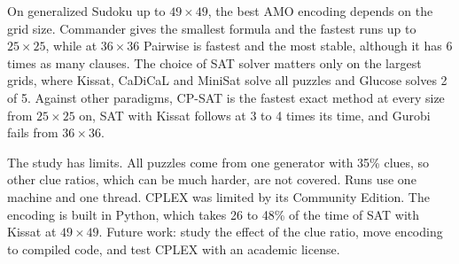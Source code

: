 On generalized Sudoku up to $49\times49$, the best AMO encoding depends on the grid size. Commander gives the smallest formula and the fastest runs up to $25\times25$, while at $36\times36$ Pairwise is fastest and the most stable, although it has 6 times as many clauses. The choice of SAT solver matters only on the largest grids, where Kissat, CaDiCaL and MiniSat solve all puzzles and Glucose solves 2 of 5. Against other paradigms, CP-SAT is the fastest exact method at every size from $25\times25$ on, SAT with Kissat follows at 3 to 4 times its time, and Gurobi fails from $36\times36$.

The study has limits. All puzzles come from one generator with 35\% clues, so other clue ratios, which can be much harder, are not covered. Runs use one machine and one thread. CPLEX was limited by its Community Edition. The encoding is built in Python, which takes 26 to 48\% of the time of SAT with Kissat at $49\times49$. Future work: study the effect of the clue ratio, move encoding to compiled code, and test CPLEX with an academic license.
